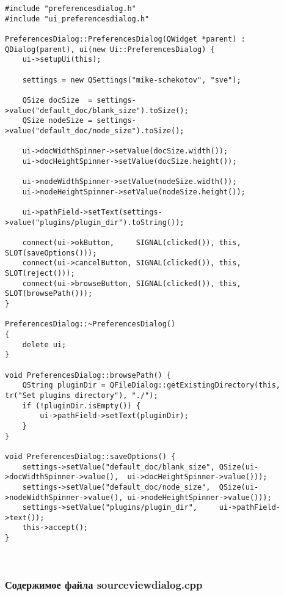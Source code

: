 \begin{lstlisting}
#include "preferencesdialog.h"
#include "ui_preferencesdialog.h"

PreferencesDialog::PreferencesDialog(QWidget *parent) : QDialog(parent), ui(new Ui::PreferencesDialog) {
    ui->setupUi(this);

    settings = new QSettings("mike-schekotov", "sve");

    QSize docSize  = settings->value("default_doc/blank_size").toSize();
    QSize nodeSize = settings->value("default_doc/node_size").toSize();

    ui->docWidthSpinner->setValue(docSize.width());
    ui->docHeightSpinner->setValue(docSize.height());

    ui->nodeWidthSpinner->setValue(nodeSize.width());
    ui->nodeHeightSpinner->setValue(nodeSize.height());

    ui->pathField->setText(settings->value("plugins/plugin_dir").toString());

    connect(ui->okButton,     SIGNAL(clicked()), this, SLOT(saveOptions()));
    connect(ui->cancelButton, SIGNAL(clicked()), this, SLOT(reject()));
    connect(ui->browseButton, SIGNAL(clicked()), this, SLOT(browsePath()));
}

PreferencesDialog::~PreferencesDialog()
{
    delete ui;
}

void PreferencesDialog::browsePath() {
    QString pluginDir = QFileDialog::getExistingDirectory(this, tr("Set plugins directory"), "./");
    if (!pluginDir.isEmpty()) {
        ui->pathField->setText(pluginDir);
    }
}

void PreferencesDialog::saveOptions() {
    settings->setValue("default_doc/blank_size", QSize(ui->docWidthSpinner->value(),  ui->docHeightSpinner->value()));
    settings->setValue("default_doc/node_size",  QSize(ui->nodeWidthSpinner->value(), ui->nodeHeightSpinner->value()));
    settings->setValue("plugins/plugin_dir",     ui->pathField->text());
    this->accept();
}
\end{lstlisting}~\\

\subsubsection*{Содержимое файла sourceviewdialog.cpp}

